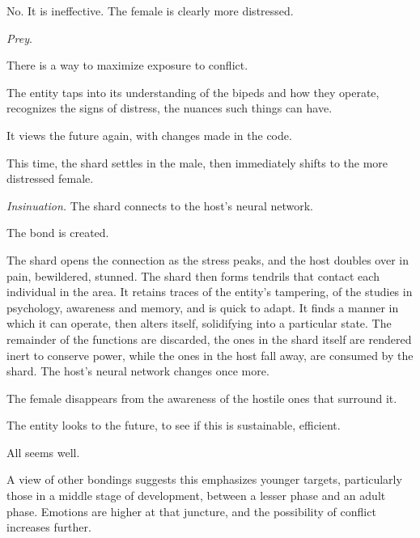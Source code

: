 No.  It is ineffective.  The female is clearly more distressed.



\emph{Prey}.



There is a way to maximize exposure to conflict.



The entity taps into its understanding of the bipeds and how they operate, recognizes the signs of distress, the nuances such things can have.



It views the future again, with changes made in the code.



This time, the shard settles in the male, then immediately shifts to the more distressed female.



\emph{Insinuation.  }The shard connects to the host's neural network.



The bond is created.



The shard opens the connection as the stress peaks, and the host doubles over in pain, bewildered, stunned.  The shard then forms tendrils that contact each individual in the area.  It retains traces of the entity's tampering, of the studies in psychology, awareness and memory, and is quick to adapt.  It finds a manner in which it can operate, then alters itself, solidifying into a particular state.  The remainder of the functions are discarded, the ones in the shard itself are rendered inert to conserve power, while the ones in the host fall away, are consumed by the shard.  The host's neural network changes once more.



The female disappears from the awareness of the hostile ones that surround it.



The entity looks to the future, to see if this is sustainable, efficient.



All seems well.



A view of other bondings suggests this emphasizes younger targets, particularly those in a middle stage of development, between a lesser phase and an adult phase.  Emotions are higher at that juncture, and the possibility of conflict increases further.




